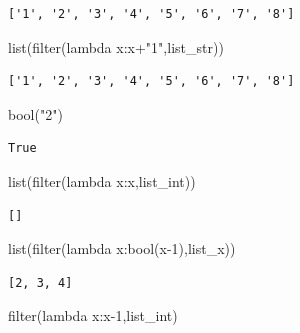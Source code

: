\documentclass[
  a4paper,
  DIV=11,
  numbers=noendperiod]{scrreprt}
\newenvironment{Shaded}{\begin{snugshade}}{\end{snugshade}}
\newcommand{\BuiltInTok}[1]{\textcolor[rgb]{0.00,0.23,0.31}{#1}}
\newcommand{\DecValTok}[1]{\textcolor[rgb]{0.68,0.00,0.00}{#1}}
\newcommand{\KeywordTok}[1]{\textcolor[rgb]{0.00,0.23,0.31}{#1}}
\newcommand{\NormalTok}[1]{\textcolor[rgb]{0.00,0.23,0.31}{#1}}
\newcommand{\OperatorTok}[1]{\textcolor[rgb]{0.37,0.37,0.37}{#1}}
\newcommand{\StringTok}[1]{\textcolor[rgb]{0.13,0.47,0.30}{#1}}
\begin{document}
\begin{verbatim}
['1', '2', '3', '4', '5', '6', '7', '8']
\end{verbatim}

\begin{Shaded}
\begin{Highlighting}[]
\BuiltInTok{list}\NormalTok{(}\BuiltInTok{filter}\NormalTok{(}\KeywordTok{lambda}\NormalTok{ x:x}\OperatorTok{+}\StringTok{"1"}\NormalTok{,list\_str))}
\end{Highlighting}
\end{Shaded}

\begin{verbatim}
['1', '2', '3', '4', '5', '6', '7', '8']
\end{verbatim}

\begin{Shaded}
\begin{Highlighting}[]
\BuiltInTok{bool}\NormalTok{(}\StringTok{"2"}\NormalTok{)}
\end{Highlighting}
\end{Shaded}

\begin{verbatim}
True
\end{verbatim}

\begin{Shaded}
\begin{Highlighting}[]
\BuiltInTok{list}\NormalTok{(}\BuiltInTok{filter}\NormalTok{(}\KeywordTok{lambda}\NormalTok{ x:x,list\_int))}
\end{Highlighting}
\end{Shaded}

\begin{verbatim}
[]
\end{verbatim}

\begin{Shaded}
\begin{Highlighting}[]
\BuiltInTok{list}\NormalTok{(}\BuiltInTok{filter}\NormalTok{(}\KeywordTok{lambda}\NormalTok{ x:}\BuiltInTok{bool}\NormalTok{(x}\OperatorTok{{-}}\DecValTok{1}\NormalTok{),list\_x))}
\end{Highlighting}
\end{Shaded}

\begin{verbatim}
[2, 3, 4]
\end{verbatim}

\begin{Shaded}
\begin{Highlighting}[]
\BuiltInTok{filter}\NormalTok{(}\KeywordTok{lambda}\NormalTok{ x:x}\OperatorTok{{-}}\DecValTok{1}\NormalTok{,list\_int)}
\end{Highlighting}
\end{Shaded}
\end{document}
